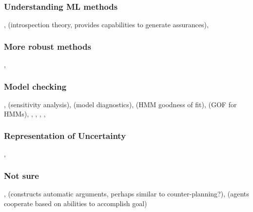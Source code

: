 \subsubsection{Understanding ML methods} \cite{Bakry2015-td}, \cite{Konolige1985-vx} (introspection theory, provides capabilities to generate assurances),  
\subsubsection{More robust methods} \cite{Bashivan2015-fc},  \cite{Tellex2012-hn}
\subsubsection{Model checking} \cite{Titman2008-ct}, \cite{Laskey1995-jp} (sensitivity analysis), \cite{Sinharay2006-yc} (model diagnostics), \cite{Titman2012-zw} (HMM goodness of fit), \cite{MacKay_Altman2004-fl} (GOF for HMMs), \cite{Dannemann2008-ch}, \cite{Titman2010-qx}, \cite{Johnson2004-mv}, \cite{Yuan2012-tb}, \cite{Spiegelhalter2002-ia}
\subsubsection{Representation of Uncertainty} \cite{Laskey2015-gz}, \cite{Costa2012-fa}

\subsubsection{Not sure} , \cite{Gutfreund2016-xe} (constructs automatic arguments, perhaps similar to counter-planning?), \cite{Charif2013-vo} (agents cooperate based on abilities to accomplish goal)
